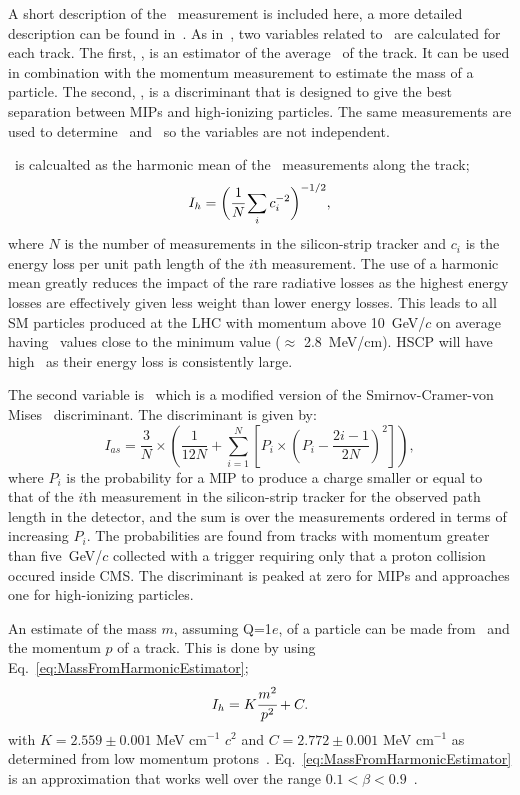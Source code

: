 A short description of the \dedx\ measurement is included here, a more detailed description can be found in~\cite{2010EPJC...70.1165K, Khachatryan:2011ts, Quertenmont:1361029}.
As in~\cite{Chatrchyan:2012sp}, two variables related to \dedx\ are calculated for each track. 
The first, \ih, is an estimator of the average \dedx\ of the track. It can be used in combination with the momentum measurement to estimate the mass of a particle.
The second, \ias, is a discriminant that is designed to give the best separation between MIPs and high-ionizing particles.
The same measurements are used to determine \ih\ and \ias\ so the variables are not independent.

\ih\ is calcualted as the harmonic mean of the \dedx\ measurements along the track;
\begin{equation}
 I_h= \biggl( \cfrac{1}{N} \sum_i c_{i}^{-2} \biggr)^{-1/2},
 \label{eq:HarmonicEstimator}
\end{equation}
where $N$ is the number of measurements in the silicon-strip tracker and $c_{i}$ is the energy loss per unit path length
of the $i$th measurement. The use of a harmonic mean greatly reduces the impact of the rare radiative losses as the highest energy
losses are effectively given less weight than lower energy losses. This leads to all
SM particles produced at the LHC with momentum above 10~GeV/$c$ on average having \ih\ values close to the minimum value ($\approx$ 2.8~MeV/cm). 
HSCP will have high \ih\ as their energy loss is consistently large.

The second variable is \ias\ which is a modified version of the Smirnov-Cramer-von Mises~\cite{Eadie, James} discriminant.
The discriminant is given by:
\begin{equation}
 I_{as} = \frac{3}{N} \times \left(
   \frac{1}{12N} + \sum_{i=1}^N
   \left[
   P_i \times \left( P_i - \frac{2i-1}{2N} \right)^2 \right] \right),
\end{equation}
where $P_i$ is the probability for a MIP to
produce a charge smaller or equal to that of the $i$th measurement in the silicon-strip tracker
for the observed path length in the detector, and the sum is over the
measurements ordered in terms of increasing $P_i$. The probabilities are found from tracks with momentum greater than five~GeV/$c$ collected with a trigger requiring only
that a proton collision occured inside CMS.
The discriminant is peaked at zero for MIPs and approaches one for high-ionizing particles.

An estimate of the mass $m$, assuming Q=1$e$, of a particle can be made from \ih\ and the momentum $p$ of a track. This is done by using Eq.~\ref{eq:MassFromHarmonicEstimator};
\begin{equation}
I_h= K\cfrac{m^2}{p^2}+C.
\label{eq:MassFromHarmonicEstimator}
\end{equation}
with  $K=2.559 \pm 0.001$ MeV cm$^{-1}$ $c^2$ and $C=2.772 \pm 0.001$ MeV cm$^{-1}$ as determined from low momentum protons~\cite{Khachatryan:2011ts}.
Eq.~\ref{eq:MassFromHarmonicEstimator} is an approximation that works well over the range $0.1 < \beta < 0.9$~\cite{PDG}.
